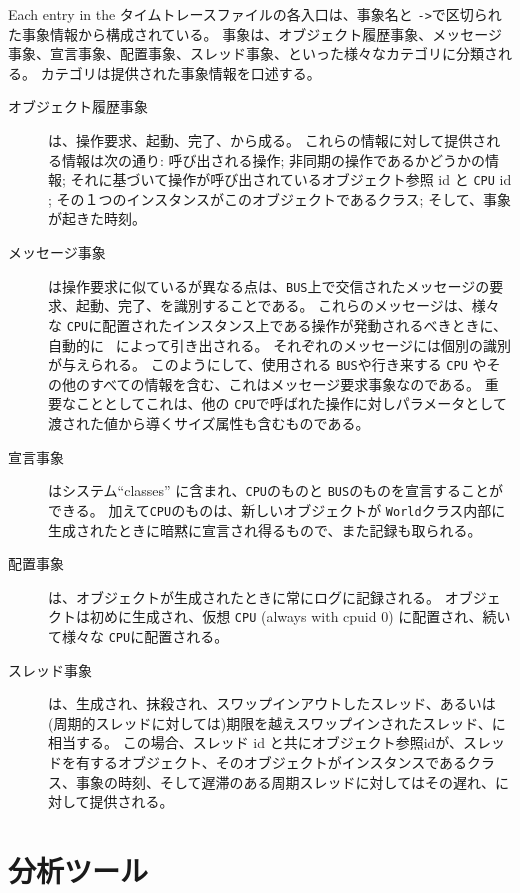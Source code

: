 \documentclass[\pformat,12pt]{jreport}
\begin{document}
Each entry in the タイムトレースファイルの各入口は、事象名と \texttt{->}で区切られた事象情報から構成されている。
事象は、オブジェクト履歴事象、メッセージ事象、宣言事象、配置事象、スレッド事象、といった様々なカテゴリに分類される。
カテゴリは提供された事象情報を口述する。

\begin{description}
\item[オブジェクト履歴事象] は、操作要求、起動、完了、から成る。
これらの情報に対して提供される情報は次の通り: 呼び出される操作; 非同期の操作であるかどうかの情報; それに基づいて操作が呼び出されているオブジェクト参照 id と \texttt{CPU} id ; その１つのインスタンスがこのオブジェクトであるクラス; そして、事象が起きた時刻。
\item[メッセージ事象] は操作要求に似ているが異なる点は、\texttt{BUS}上で交信されたメッセージの要求、起動、完了、を識別することである。
これらのメッセージは、様々な \texttt{CPU}に配置されたインスタンス上である操作が発動されるべきときに、自動的に \VDMTools\ によって引き出される。
それぞれのメッセージには個別の識別が与えられる。
このようにして、使用される \texttt{BUS}や行き来する \texttt{CPU} やその他のすべての情報を含む、これはメッセージ要求事象なのである。
重要なこととしてこれは、他の \texttt{CPU}で呼ばれた操作に対しパラメータとして渡された値から導くサイズ属性も含むものである。
\item[宣言事象] はシステム``classes'' に含まれ、\texttt{CPU}のものと \texttt{BUS}のものを宣言することができる。
加えて\texttt{CPU}のものは、新しいオブジェクトが \texttt{World}クラス内部に生成されたときに暗黙に宣言され得るもので、また記録も取られる。
\item[配置事象] は、オブジェクトが生成されたときに常にログに記録される。
    オブジェクトは初めに生成され、仮想 \texttt{CPU} (always with cpuid 0) に配置され、続いて様々な \texttt{CPU}に配置される。
\item[スレッド事象] は、生成され、抹殺され、スワップインアウトしたスレッド、あるいは(周期的スレッドに対しては)期限を越えスワップインされたスレッド、に相当する。
この場合、スレッド id と共にオブジェクト参照idが、スレッドを有するオブジェクト、そのオブジェクトがインスタンスであるクラス、事象の時刻、そして遅滞のある周期スレッドに対してはその遅れ、に対して提供される。
\end{description}

\section{分析ツール}
\end{document}
